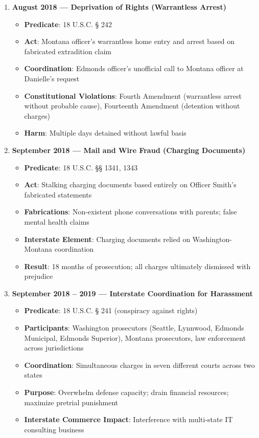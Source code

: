 \documentclass[12pt,letterpaper]{article}
\begin{document}
\begin{enumerate}
\item \textbf{August 2018 --- Deprivation of Rights (Warrantless Arrest)}

\begin{itemize}
\item \textbf{Predicate}: 18 U.S.C. § 242
\item \textbf{Act}: Montana officer's warrantless home entry and arrest based on fabricated extradition claim
\item \textbf{Coordination}: Edmonds officer's unofficial call to Montana officer at Danielle's request
\item \textbf{Constitutional Violations}: Fourth Amendment (warrantless arrest without probable cause), Fourteenth Amendment (detention without charges)
\item \textbf{Harm}: Multiple days detained without lawful basis
\end{itemize}

\item \textbf{September 2018 --- Mail and Wire Fraud (Charging Documents)}

\begin{itemize}
\item \textbf{Predicate}: 18 U.S.C. §§ 1341, 1343
\item \textbf{Act}: Stalking charging documents based entirely on Officer Smith's fabricated statements
\item \textbf{Fabrications}: Non-existent phone conversations with parents; false mental health claims
\item \textbf{Interstate Element}: Charging documents relied on Washington-Montana coordination
\item \textbf{Result}: 18 months of prosecution; all charges ultimately dismissed with prejudice
\end{itemize}

\item \textbf{September 2018 -- 2019 --- Interstate Coordination for Harassment}

\begin{itemize}
\item \textbf{Predicate}: 18 U.S.C. § 241 (conspiracy against rights)
\item \textbf{Participants}: Washington prosecutors (Seattle, Lynnwood, Edmonds Municipal, Edmonds Superior), Montana prosecutors, law enforcement across jurisdictions
\item \textbf{Coordination}: Simultaneous charges in seven different courts across two states
\item \textbf{Purpose}: Overwhelm defense capacity; drain financial resources; maximize pretrial punishment
\item \textbf{Interstate Commerce Impact}: Interference with multi-state IT consulting business
\end{itemize}


\end{enumerate}
\end{document}
